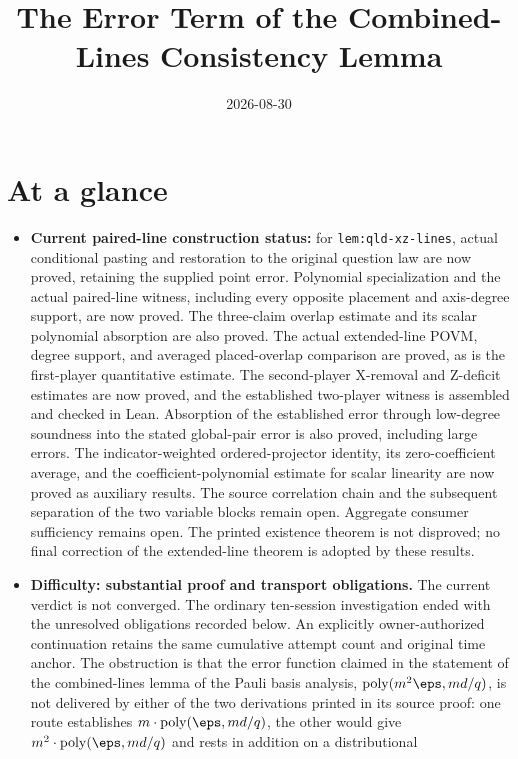 \documentclass[11pt]{article}
\title{The Error Term of the Combined-Lines Consistency Lemma}
\author{}
\date{2026-08-30}
\DeclareMathOperator{\poly}{poly}
\begin{document}
\maketitle

\section{At a glance}

\begin{itemize}
  \item \textbf{Current paired-line construction status:} for
  \texttt{lem:qld-xz-lines}, actual conditional pasting and restoration to
  the original question law are now proved, retaining the supplied point
  error. Polynomial specialization and the actual paired-line witness,
  including every opposite placement and axis-degree support, are now proved.
  The three-claim overlap estimate and its scalar polynomial absorption are
  also proved. The actual extended-line POVM, degree support, and averaged
  placed-overlap comparison are proved, as is the first-player quantitative
  estimate. The second-player X-removal and Z-deficit estimates are now
  proved, and the established two-player witness is assembled and checked
  in Lean. Absorption of the established error through low-degree soundness
  into the stated global-pair error is also proved, including large errors.
  The indicator-weighted ordered-projector identity, its zero-coefficient
  average, and the coefficient-polynomial estimate for scalar linearity
  are now proved as auxiliary results. The source correlation chain and
  the subsequent separation of the two variable blocks remain open.
  Aggregate consumer sufficiency remains open.
  The printed existence theorem is not disproved; no final correction
  of the extended-line theorem is adopted by these results.
  \item \textbf{Difficulty: substantial proof and transport obligations.}
  The current verdict is not converged. The ordinary ten-session
  investigation ended with the unresolved obligations recorded below.
  An explicitly owner-authorized continuation retains the same cumulative
  attempt count and original time anchor.
  The obstruction is that the error function claimed in the
  statement of the combined-lines lemma of the Pauli basis analysis,
  $\poly(m^2\eps, md/q)$, is not delivered by either of the two
  derivations printed in its source proof: one route establishes
  $m \cdot \poly(\eps, md/q)$, the other would give
  $m^2 \cdot \poly(\eps, md/q)$ and rests in addition on a distributional

\end{itemize}
\end{document}
